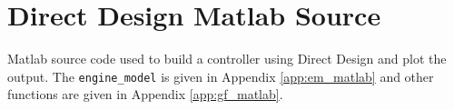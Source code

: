 \documentclass{article}
\begin{document}


\clearpage



\clearpage
\section{Direct Design Matlab Source}
\label{app:dd_matlab}

Matlab source code used to build a controller using Direct Design
and plot the output.
The \verb+engine_model+ is given in Appendix \ref{app:em_matlab}
and other functions are given in Appendix \ref{app:gf_matlab}.



\clearpage


\end{document}
